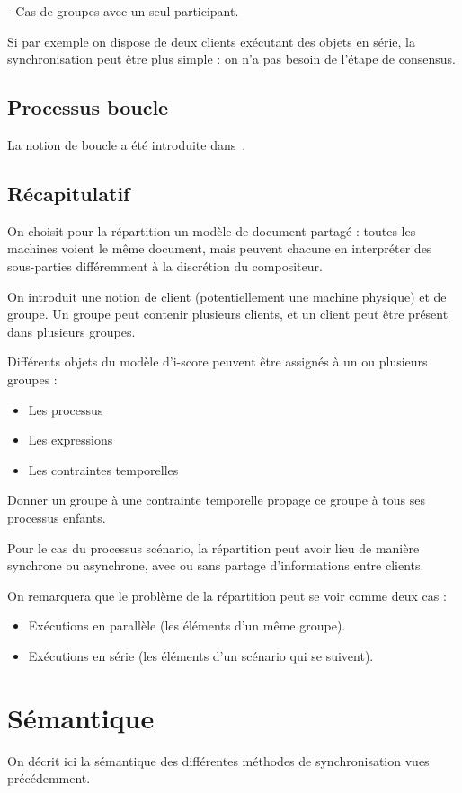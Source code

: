 \documentclass{article}
\begin{document}
- Cas de groupes avec un seul participant.

Si par exemple on dispose de deux clients exécutant des objets en série,
la synchronisation peut être plus simple : on n'a pas besoin de l'étape de consensus.
\subsection{Processus boucle}
La notion de boucle a été introduite dans~\cite{celerier2016graphical}.

\subsection{Récapitulatif}
On choisit pour la répartition un modèle de document partagé : toutes les machines voient le même document, mais peuvent chacune en interpréter des sous-parties différemment à la discrétion du compositeur.

On introduit une notion de client (potentiellement une machine physique) et de groupe.
Un groupe peut contenir plusieurs clients, et un client peut être présent dans plusieurs groupes.

Différents objets du modèle d'i-score peuvent être assignés à un ou plusieurs groupes : 

\begin{itemize}
	\item Les processus
	\item Les expressions
	\item Les contraintes temporelles
\end{itemize}

Donner un groupe à une contrainte temporelle propage ce groupe à tous ses processus enfants.

Pour le cas du processus scénario, la répartition peut avoir lieu de manière synchrone ou asynchrone, 
avec ou sans partage d'informations entre clients.

On remarquera que le problème de la répartition peut se voir comme deux cas : 
\begin{itemize}
	\item Exécutions en parallèle (les éléments d'un même groupe).
	\item Exécutions en série (les éléments d'un scénario qui se suivent).
\end{itemize}

\section{Sémantique}\label{sec.semantique}
On décrit ici la sémantique des différentes méthodes de synchronisation vues précédemment.
\end{document}
